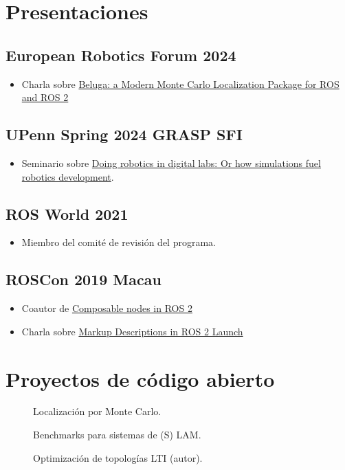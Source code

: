 \documentclass[spanish, letterpaper]{resume}
\begin{document}
\noindent\begin{minipage}[t]{0.475\linewidth}
  \section*{Presentaciones}
  \subsection*[\icon{erf}]{European Robotics Forum 2024}
  \begin{itemize}
      \item Charla sobre \href{https://link.springer.com/chapter/10.1007/978-3-031-76424-0_23}{Beluga: a Modern Monte Carlo Localization Package for ROS and ROS 2}
  \end{itemize}
  \subsection*[\icon{upenn}]{UPenn Spring 2024 GRASP SFI}
  \begin{itemize}
    \item Seminario sobre \href{https://www.grasp.upenn.edu/events/spring-2024-grasp-sfi-michel-hidalgo}{Doing robotics in digital labs: Or how simulations fuel robotics development}.
  \end{itemize}
  \subsection*[\icon{ros}]{ROS World 2021}
  \begin{itemize}
    \item Miembro del comité de revisión del programa.
  \end{itemize}
  \subsection*[\icon{ros}]{ROSCon 2019 Macau}
  \begin{itemize}
    \item Coautor de \href{https://roscon.ros.org/2019/talks/roscon2019_composablenodes.pdf}{Composable nodes in ROS 2}
    \item Charla sobre \href{https://roscon.ros.org/2019/talks/roscon2019_markupextensionsforros2launch.pdf}{Markup Descriptions in ROS 2 Launch}
  \end{itemize}
\end{minipage}\hfill
\begin{minipage}[t]{0.475\linewidth}
  \section*{Proyectos de código abierto}
  \begin{description}
    \item[] Localización por Monte Carlo.
    \item[] Benchmarks para sistemas de (S) LAM.
    \item[] Optimización de topologías LTI (autor).
  \end{description}
\end{minipage}
\end{document}

